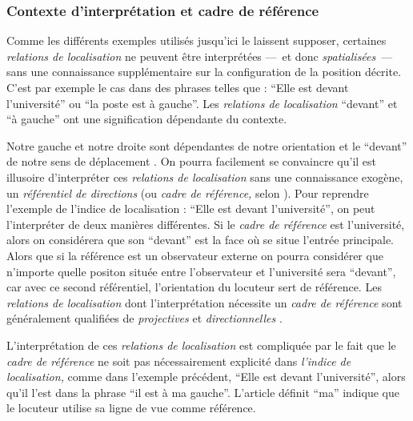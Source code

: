 \subsubsection{Contexte d'interprétation et cadre de référence}



Comme les différents exemples utilisés jusqu'ici le laissent supposer,
certaines \emph{relations de localisation} ne peuvent être
interprétées ---~et donc \emph{spatialisées}~--- sans une connaissance
supplémentaire sur la configuration de la position décrite. C'est par
exemple le cas dans des phrases telles que : \enquote{Elle est devant
  l'université} ou \enquote{la poste est à gauche}. Les
\emph{relations de localisation} \enquote{devant} et \enquote{à
  gauche} ont une signification dépendante du contexte.

Notre gauche et notre droite sont dépendantes de notre orientation et
le \enquote{devant} de notre sens de déplacement
\autocite{Vandeloise1986}. On pourra facilement se convaincre qu'il
est illusoire d'interpréter ces \emph{relations de localisation} sans
une connaissance exogène, un \emph{référentiel de directions} (ou
\emph{cadre de référence,} selon \cite{Clementini2013}). Pour
reprendre l'exemple de l'indice de localisation : \enquote{Elle est
  devant l'université}, on peut l'interpréter de deux manières
différentes. Si le \emph{cadre de référence} est l'université, alors
on considérera que son \enquote{devant} est la face où se situe
l'entrée principale. Alors que si la référence est un observateur
externe on pourra considérer que n'importe quelle positon située entre
l'observateur et l'université sera \enquote{devant}, car avec ce
second référentiel, l'orientation du locuteur sert de référence. Les
\emph{relations de localisation} dont l'interprétation nécessite un
\emph{cadre de référence} sont généralement qualifiées de
\emph{projectives} et \emph{directionnelles} \autocite{Duchene2019}.

L'interprétation de ces \emph{relations de localisation} est
compliquée par le fait que le \emph{cadre de référence} ne soit pas
nécessairement explicité dans \emph{l'indice de localisation,} comme
dans l'exemple précédent, \enquote{Elle est devant l'université},
alors qu'il l'est dans la phrase \enquote{il est à ma
  gauche}. L'article définit \enquote{ma} indique que le locuteur
utilise sa ligne de vue comme référence.

